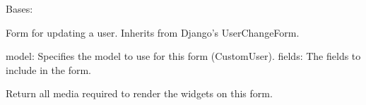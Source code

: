 \documentclass[letterpaper,10pt,english]{sphinxmanual}
\begin{document}
\begin{fulllineitems}
\label{\detokenize{modules/forms:account.forms.CustomUserChangeForm}}
\pysigstartsignatures
{}
\pysigstopsignatures
\sphinxAtStartPar
Bases: 

\sphinxAtStartPar
Form for updating a user. Inherits from Django’s UserChangeForm.
\begin{description}
\sphinxAtStartPar
model: Specifies the model to use for this form (CustomUser).
fields: The fields to include in the form.

\end{description}

\begin{fulllineitems}
\label{\detokenize{modules/forms:account.forms.CustomUserChangeForm.media}}
\pysigstartsignatures
{}
\pysigstopsignatures
\sphinxAtStartPar
Return all media required to render the widgets on this form.

\end{fulllineitems}


\end{fulllineitems}

\end{document}
